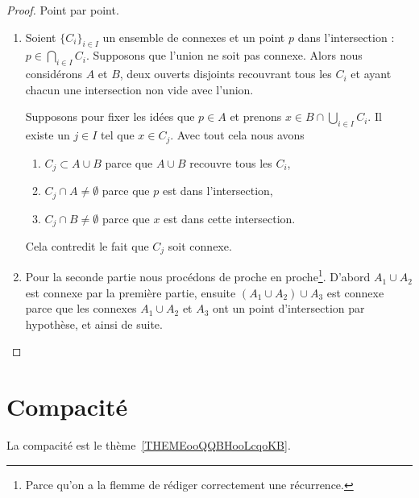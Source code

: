 \begin{proof}
	Point par point.
	\begin{enumerate}
		\item
		      Soient \( \{ C_i \}_{i\in I}\) un ensemble de connexes et un point \( p\) dans l'intersection : \( p\in\bigcap_{i\in I}C_i\). Supposons que l'union ne soit pas connexe. Alors nous considérons \( A\) et \( B\), deux ouverts disjoints recouvrant tous les \( C_i\) et ayant chacun une intersection non vide avec l'union.

		      Supposons pour fixer les idées que \( p\in A\) et prenons \( x\in B\cap\bigcup_{i\in I}C_i\). Il existe un \( j\in I\) tel que \( x\in C_j\). Avec tout cela nous avons
		      \begin{enumerate}
			      \item
			            \( C_j\subset A\cup B\) parce que \(A \cup B\) recouvre tous les \( C_i \),
			      \item
			            \( C_j\cap A\neq \emptyset\) parce que \( p\) est dans l'intersection,
			      \item
			            \( C_j\cap B\neq\emptyset\) parce que \( x\) est dans cette intersection.
		      \end{enumerate}
		      Cela contredit le fait que \( C_j\) soit connexe.

		\item

		      Pour la seconde partie nous procédons de proche en proche\footnote{Parce qu'on a la flemme de rédiger correctement une récurrence.}. D'abord \( A_1\cup A_2\) est connexe par la première partie, ensuite \( (A_1\cup A_2)\cup A_3\) est connexe parce que les connexes \( A_1\cup A_2\) et \( A_3\) ont un point d'intersection par hypothèse, et ainsi de suite.
	\end{enumerate}
\end{proof}


\section{Compacité}

La compacité est le thème~\ref{THEMEooQQBHooLcqoKB}.

